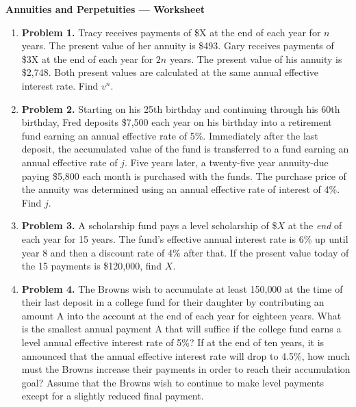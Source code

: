 \documentclass[11pt]{article}
\begin{document}
\begin{center}
  {\LARGE \textbf{Annuities and Perpetuities — Worksheet}\\[6pt]}
\end{center}

\bigskip

\begin{enumerate}[leftmargin=*,itemsep=12pt]
  \item \textbf{Problem 1.} Tracy receives payments of \$X at the end of each year for $n$ years. The present value of her annuity is \$493. Gary receives payments of \$3X at the end of each year for $2n$ years. The present value of his annuity is \$2{,}748. Both present values are calculated at the same annual effective interest rate. Find $v^n$.

  \item \textbf{Problem 2.} Starting on his 25th birthday and continuing through his 60th birthday, Fred deposits \$7,500 each year on his birthday into a retirement fund earning an annual effective rate of 5\%. Immediately after the last deposit, the accumulated value of the fund is transferred to a fund earning an annual effective rate of $j$. Five years later, a twenty-five year annuity-due paying \$5,800 each month is purchased with the funds. The purchase price of the annuity was determined using an annual effective rate of interest of 4\%. Find $j$.

  \item \textbf{Problem 3.} A scholarship fund pays a level scholarship of \$\(X\) at the \emph{end} of each year for 15 years. The fund’s effective annual interest rate is 6\% up until year $8$ and then a discount rate of 4\% after that. If the present value today of the 15 payments is \$120,000, find \(X\).

  \item \textbf{Problem 4.} The Browns wish to accumulate at least 150,000 at the time of their last
deposit in a college fund for their daughter by contributing an amount
A into the account at the end of each year for eighteen years. What is
the smallest annual payment A that will suffice if the college fund earns
a level annual effective interest rate of 5\%? If at the end of ten years, it
is announced that the annual effective interest rate will drop to 4.5\%,
how much must the Browns increase their payments in order to reach
their accumulation goal? Assume that the Browns wish to continue to
make level payments except for a slightly reduced final payment.


\end{enumerate}
\end{document}
